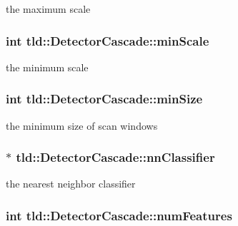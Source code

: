the maximum scale 

\hypertarget{classtld_1_1DetectorCascade_a24aed44c48fe4616465a556bd6642d5e}{
\subsubsection[{min\-Scale}]{\setlength{\rightskip}{0pt plus 5cm}int tld\-::\-Detector\-Cascade\-::min\-Scale}}\label{classtld_1_1DetectorCascade_a24aed44c48fe4616465a556bd6642d5e}


the minimum scale 

\hypertarget{classtld_1_1DetectorCascade_add27e1ff17e2fda214d08f74d0c164e9}{
\subsubsection[{min\-Size}]{\setlength{\rightskip}{0pt plus 5cm}int tld\-::\-Detector\-Cascade\-::min\-Size}}\label{classtld_1_1DetectorCascade_add27e1ff17e2fda214d08f74d0c164e9}


the minimum size of scan windows 

\hypertarget{classtld_1_1DetectorCascade_abc9da459b6d66e5a2f2658f52b4dfdc6}{
\subsubsection[{nn\-Classifier}]{$\ast$ tld\-::\-Detector\-Cascade\-::nn\-Classifier}}\label{classtld_1_1DetectorCascade_abc9da459b6d66e5a2f2658f52b4dfdc6}


the nearest neighbor classifier 

\hypertarget{classtld_1_1DetectorCascade_a63af0a8c55ac292b25f2f72b6e734280}{
\subsubsection[{num\-Features}]{\setlength{\rightskip}{0pt plus 5cm}int tld\-::\-Detector\-Cascade\-::num\-Features}}\label{classtld_1_1DetectorCascade_a63af0a8c55ac292b25f2f72b6e734280}


